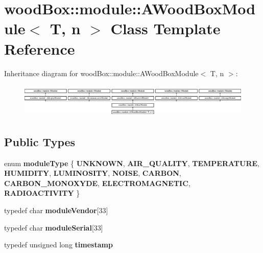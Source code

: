 \hypertarget{classwood_box_1_1module_1_1_a_wood_box_module}{}\section{wood\+Box\+:\+:module\+:\+:A\+Wood\+Box\+Module$<$ T, n $>$ Class Template Reference}
\label{classwood_box_1_1module_1_1_a_wood_box_module}
Inheritance diagram for wood\+Box\+:\+:module\+:\+:A\+Wood\+Box\+Module$<$ T, n $>$\+:\begin{figure}[H]
\begin{center}
\leavevmode
\includegraphics[height=1.635036cm]{classwood_box_1_1module_1_1_a_wood_box_module}
\end{center}
\end{figure}
\subsection*{Public Types}
\begin{DoxyCompactItemize}
\item 
\mbox{\label{classwood_box_1_1module_1_1_a_wood_box_module_a9700d669ca2a36d350526c6b77dd2e1b}} 
enum {\bfseries module\+Type} \{ \newline
{\bfseries U\+N\+K\+N\+O\+WN}, 
{\bfseries A\+I\+R\+\_\+\+Q\+U\+A\+L\+I\+TY}, 
{\bfseries T\+E\+M\+P\+E\+R\+A\+T\+U\+RE}, 
{\bfseries H\+U\+M\+I\+D\+I\+TY}, 
\newline
{\bfseries L\+U\+M\+I\+N\+O\+S\+I\+TY}, 
{\bfseries N\+O\+I\+SE}, 
{\bfseries C\+A\+R\+B\+ON}, 
{\bfseries C\+A\+R\+B\+O\+N\+\_\+\+M\+O\+N\+O\+X\+Y\+DE}, 
\newline
{\bfseries E\+L\+E\+C\+T\+R\+O\+M\+A\+G\+N\+E\+T\+IC}, 
{\bfseries R\+A\+D\+I\+O\+A\+C\+T\+I\+V\+I\+TY}
 \}
\item 
\mbox{\label{classwood_box_1_1module_1_1_a_wood_box_module_a84715e84db188a6b16264ab46995388a}} 
typedef char {\bfseries module\+Vendor}\mbox{[}33\mbox{]}
\item 
\mbox{\label{classwood_box_1_1module_1_1_a_wood_box_module_a5800e477a21dc0097376aedfcd3971ef}} 
typedef char {\bfseries module\+Serial}\mbox{[}33\mbox{]}
\item 
\mbox{\label{classwood_box_1_1module_1_1_a_wood_box_module_a701f472a7ac991a45e9c2c87b0040f5c}} 
typedef unsigned long {\bfseries timestamp}
\end{DoxyCompactItemize}
